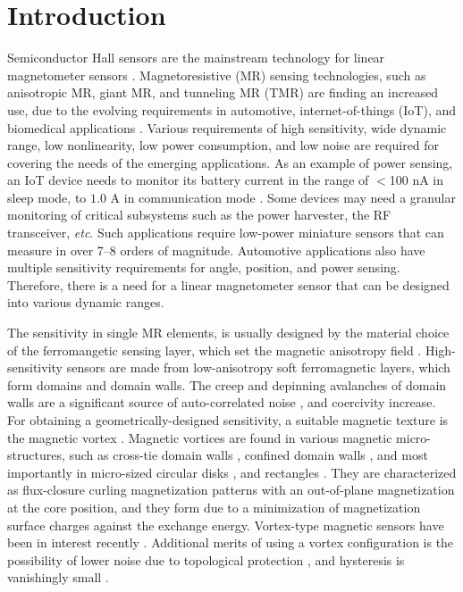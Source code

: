 \documentclass[10pt]{iopart}
\begin{document}
\section{Introduction}
    Semiconductor Hall sensors are the mainstream technology for linear magnetometer sensors \cite{review_hirohata_2020}. Magnetoresistive (MR) sensing technologies, such as anisotropic MR, giant MR, and tunneling MR (TMR) are finding an increased use, due to the evolving requirements in automotive, internet-of-things (IoT), and biomedical applications \cite{review_zheng_2019}. Various requirements of high sensitivity, wide dynamic range, low nonlinearity, low power consumption, and low noise are required for covering the needs of the emerging applications.
    As an example of power sensing, an IoT device needs to monitor its battery current in the range of $<$100 nA in sleep mode, to $1.0$ A in communication mode \cite{hertlein_2018,TI_CC2650MODA}. Some devices may need a granular monitoring of critical subsystems such as the power harvester, the RF transceiver, \emph{etc}. Such applications require low-power miniature sensors that can measure in over 7--8 orders of magnitude. Automotive applications also have multiple sensitivity requirements for angle, position, and power sensing. Therefore, there is a need for a linear magnetometer sensor that can be designed into various dynamic ranges.
    
    The sensitivity in single MR elements, is usually designed by the material choice of the ferromangetic sensing layer, which set the magnetic anisotropy field \cite{fujiwara_2012_13,nakano_2017}. {High-sensitivity sensors are made from low-anisotropy soft ferromagnetic layers, which form domains and domain walls. The creep and depinning avalanches of domain walls are a significant source of auto-correlated noise \cite{ledoussal_2009,ferrero_2017}, and coercivity increase.}
    For obtaining a geometrically-designed sensitivity, a suitable magnetic texture is the magnetic vortex \cite{behncke_2018}. Magnetic vortices are found in various magnetic micro-structures, such as cross-tie domain walls \cite{metlov_2001,wiese_2007,mccord_2009}, confined domain walls \cite{meier_2007a}, and most importantly in micro-sized circular disks \cite{shinjo_2000}, and rectangles \cite{vogel_2011,miyake_2013}. They are characterized as flux-closure curling magnetization patterns with an out-of-plane magnetization at the core position, and they form due to a minimization of magnetization surface charges against the exchange energy. 
    Vortex-type magnetic sensors have been in interest recently \cite{novosad_2010, raberg_2018}. {Additional merits of using a vortex configuration is the possibility of lower noise due to topological protection \cite{suess_2018, he_2020}, and hysteresis is vanishingly small \cite{ostman_2014,he_2020}.}
    
\end{document}
